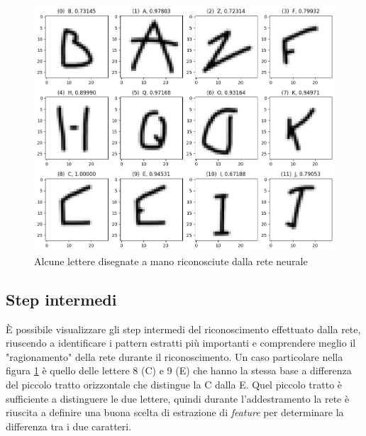 \documentclass[a4paper,12pt]{article}
\begin{document}
\begin{figure}[H]
\centering
\includegraphics[width=.8\linewidth]{images/drawn_letters_predicted.png}
\caption{Alcune lettere disegnate a mano riconosciute dalla rete neurale}
\label{drawn_letters_predicted}
\end{figure}

\subsection{Step intermedi}
È possibile visualizzare gli step intermedi del riconoscimento effettuato dalla rete, riuscendo a identificare i pattern estratti più importanti e comprendere meglio il "ragionamento" della rete durante il riconoscimento.
Un caso particolare nella figura \ref{drawn_letters_predicted} è quello delle lettere 8 (C) e 9 (E) che hanno la stessa base a differenza del piccolo tratto orizzontale che distingue la C dalla E. Quel piccolo tratto è sufficiente a distinguere le due lettere, quindi durante l'addestramento la rete è riuscita a definire una buona scelta di estrazione di \textit{feature} per determinare la differenza tra i due caratteri.
\end{document}
